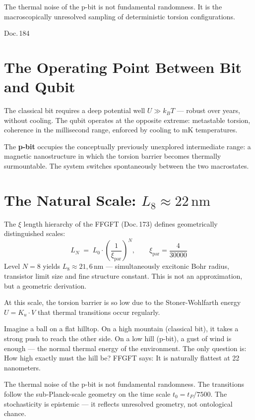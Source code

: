 \label{ch:pbit}

\epigraph{The thermal noise of the p-bit is not fundamental randomness.
It is the macroscopically unresolved sampling of deterministic
torsion configurations.}{Doc.\,184}

\section{The Operating Point Between Bit and Qubit}

The classical bit requires a deep potential well $U \gg k_B T$ ---
robust over years, without cooling. The qubit operates at the opposite
extreme: metastable torsion, coherence in the millisecond range, enforced
by cooling to mK temperatures.

The \textbf{p-bit} occupies the conceptually previously unexplored
intermediate range: a magnetic nanostructure in which the
torsion barrier becomes thermally surmountable. The system switches spontaneously
between the two macrostates.

\section{The Natural Scale: \texorpdfstring{$L_8 \approx 22\,\text{nm}$}{L8 ca. 22nm}}

The $\xi$ length hierarchy of the FFGFT (Doc.\,173) defines geometrically
distinguished scales:
\[
  L_N \;=\; L_0 \cdot \left(\frac{1}{\xi_{\text{par}}}\right)^{\!N},
  \qquad \xi_{\text{par}} = \frac{4}{30000}
\]
Level $N = 8$ yields $L_8 \approx 21{,}6\,\text{nm}$ --- simultaneously
excitonic Bohr radius, transistor limit size and fine structure constant.
This is not an approximation, but a geometric derivation. 

At this scale, the torsion barrier is so low due to the
Stoner-Wohlfarth energy $U = K_u \cdot V$ that thermal
transitions occur regularly.

\begin{laierspur}
Imagine a ball on a flat hilltop. On a high mountain
(classical bit), it takes a strong push to reach the other side.
On a low hill (p-bit), a gust of wind is enough ---
the normal thermal energy of the environment. The only question is:
How high exactly must the hill be? FFGFT says: It is naturally flattest at 22 nanometers.
\end{laierspur}

\begin{ffgftbox}
The thermal noise of the p-bit is not fundamental randomness.
The transitions follow the sub-Planck-scale geometry on the time scale
$t_0 = t_P/7500$. The stochasticity is epistemic --- it reflects
unresolved geometry, not ontological chance. 
\end{ffgftbox}

